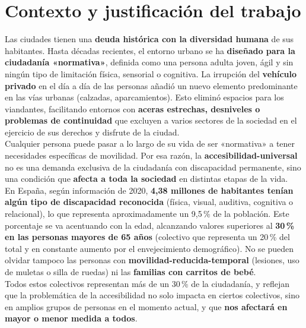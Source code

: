 \section{Contexto y justificación del trabajo}
Las ciudades tienen una \textbf{deuda histórica con la diversidad humana} de sus habitantes. Hasta décadas recientes, el entorno urbano se ha \textbf{diseñado para la ciudadanía «normativa»}, definida como una persona adulta joven, ágil y sin ningún tipo de limitación física, sensorial o cognitiva. La irrupción del \textbf{vehículo privado} en el día a día de las personas añadió un nuevo elemento predominante en las vías urbanas (calzadas, aparcamientos). Esto eliminó espacios para los viandantes, facilitando entornos con \textbf{aceras estrechas, desniveles o problemas de continuidad} que excluyen a varios sectores de la sociedad en el ejercicio de sus derechos y disfrute de la ciudad.
\\

Cualquier persona puede pasar a lo largo de su vida de ser «normativa» a tener necesidades específicas de movilidad. Por esa razón, la \textbf{\gls{accesibilidad-universal}} no es una demanda exclusiva de la ciudadanía con discapacidad permanente, sino una condición que \textbf{afecta a toda la sociedad} en distintas etapas de la vida.
\\





En España, según información de 2020, \textbf{4,38 millones de habitantes tenían algún tipo de discapacidad reconocida} (física, visual, auditiva, cognitiva o relacional), lo que representa aproximadamente un 9,5\,\% de la población. Este porcentaje se va acentuando con la edad, alcanzando valores superiores al \textbf{30\,\% en las personas mayores de 65 años} (colectivo que representa un 20\,\% del total y en constante aumento por el envejecimiento demográfico). No se pueden olvidar tampoco las personas con \textbf{\gls{movilidad-reducida-temporal}} (lesiones, uso de muletas o silla de ruedas) ni las \textbf{familias con carritos de bebé}.
\\

Todos estos colectivos representan más de un 30\,\% de la ciudadanía, y reflejan que la problemática de la accesibilidad no solo impacta en ciertos colectivos, sino en amplios grupos de personas en el momento actual, y que \textbf{nos afectará en mayor o menor medida a todos}.

